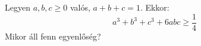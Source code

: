    Legyen $a,b,c\ge 0$ valós, $a+b+c=1$. Ekkor:
   $$
   a^{3}+b^{3}+c^{3}+6abc \ge \frac{1}{4}
   $$
   Mikor áll fenn egyenlőség?
